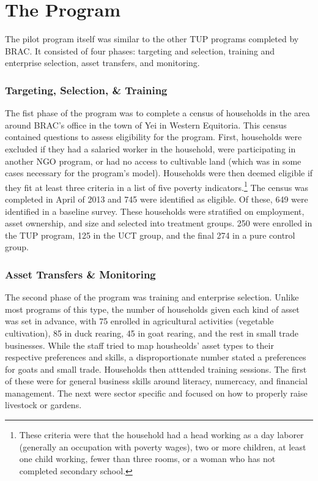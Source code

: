 \documentclass[12pt,article]{article}
\begin{document}
\section{The Program}
\label{sec-2}

The pilot program itself was similar to the other TUP programs completed by BRAC. It
consisted of four phases: targeting and selection, training and enterprise selection,
asset transfers, and monitoring. 

\subsubsection{Targeting, Selection, \& Training}
\label{sec-2-0-1}

The fist phase of the program was to complete a census of households in the area
around BRAC's office in the town of Yei in Western Equitoria. This census contained
questions to assess eligibility for the program. First, households were excluded if
they had a salaried worker in the household, were participating in another NGO
program, or had no access to cultivable land (which was in some cases necessary for
the program's model). Households were then deemed eligible if they fit at least three
criteria in a list of five poverty indicators.\footnote{These criteria were that the
household had a head working as a day laborer (generally an occupation with poverty
wages), two or more children, at least one child working, fewer than three rooms, or
a woman who has not completed secondary school.} The census was completed in April of
2013 and 745 were identified as eligible. Of these, 649 were identified in a baseline
survey. These households were stratified on employment, asset ownership, and size and
selected into treatment groups. 250 were enrolled in the TUP program, 125 in the UCT
group, and the final 274 in a pure control group.

\subsubsection{Asset Transfers \& Monitoring}
\label{sec-2-0-2}

The second phase of the program was training and enterprise selection. Unlike most
programs of this type, the number of households given each kind of asset was set in
advance, with 75 enrolled in agricultural activities (vegetable cultivation), 85 in
duck rearing, 45 in goat rearing, and the rest in small trade businesses. While the
staff tried to map housheolds' asset types to their respective preferences and
skills, a disproportionate number stated a preferences for goats and small trade.
Households then atttended training sessions. The first of these were for general
business skills around literacy, numercacy, and financial management. The next were
sector specific and focused on how to properly raise livestock or gardens. 
\end{document}
